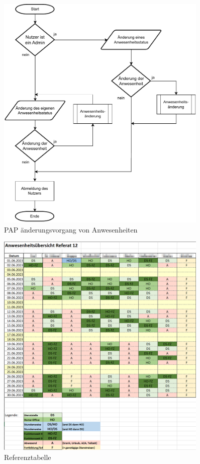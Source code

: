 \begin{figure}[htb]
    \centering
    \includegraphics[width=0.9\textwidth,angle=0]{anhang/abb/PAP_Kurz.pdf}
    \caption[Programmablaufplan]{PAP änderungsvorgang von Anwesenheiten}
    \label{abb:PAP}
\end{figure}

\begin{figure}[htb]
    \centering
    \includegraphics[width=0.9\textwidth,angle=0]{anhang/abb/Tabelle.png}
    \caption[Referenztabelle]{Referenztabelle}
    \label{abb:Ausgangstabelle}
\end{figure}

